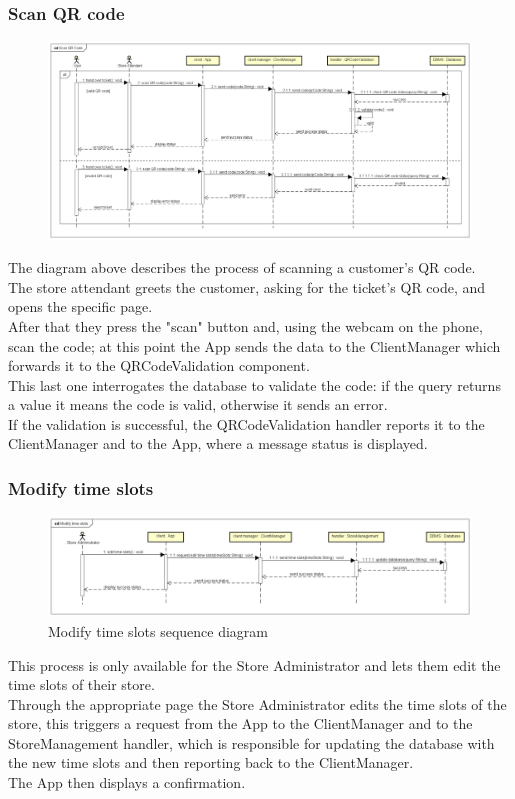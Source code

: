 \documentclass[table, 12pt]{article}
\begin{document}
\subsubsection{Scan QR code}
\begin{figure}[H]
    \begin{center}
        \includegraphics[width=\textwidth]{assets/Sequence-Diagram/scan-QR-code.png}
    \end{center}
\end{figure}
The diagram above describes the process of scanning a customer's QR code.\\
The store attendant greets the customer, asking for the ticket's QR code, and opens the specific page.\\
After that they press the "scan" button and, using the webcam on the phone, scan the code; at this point the App sends the data to the ClientManager which forwards it to the QRCodeValidation component.\\
This last one interrogates the database to validate the code: if the query returns a value it means the code is valid, otherwise it sends an error.\\
If the validation is successful, the QRCodeValidation handler reports it to the ClientManager and to the App, where a message status is displayed.
\subsubsection{Modify time slots}
\begin{figure}[H]
    \begin{center}
        \includegraphics[width=\textwidth]{assets/Sequence-Diagram/edit-time-slots.png}
        \caption{Modify time slots sequence diagram}
    \end{center}
\end{figure}
This process is only available for the Store Administrator  and lets them edit the time slots of their store.\\
Through the appropriate page the Store Administrator edits the time slots of the store, this triggers a request from the App to the ClientManager and to the StoreManagement handler, which is responsible for updating the database with the new time slots and then reporting back to the ClientManager.\\
The App then displays a confirmation.
\end{document}
